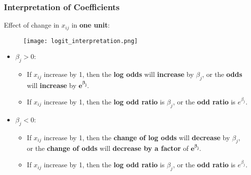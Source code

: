 \subsubsection{Interpretation of Coefficients}
Effect of change in $x_{ij}$ in \textbf{one unit}:
\begin{figure}[H]
	\centering
	\texttt{[image: logit\_interpretation.png]}
\end{figure}
\begin{itemize}
	\item $\beta_j >0$: 
	\begin{itemize}
		\item If $x_{ij}$ increase by 1, then the \textbf{log odds} will \textbf{increase} by $\beta_j$, or the \textbf{odds} will \textbf{increase} by $\mathbf{e^{\beta_j}}$.
		\item If $x_{ij}$ increase by 1, then the \textbf{log odd ratio} is $\beta_j$, or the \textbf{odd ratio} is $e^{\beta_j}$.
	\end{itemize}
	\item $\beta_j < 0$:
	 \begin{itemize}
	 	\item If $x_{ij}$ increase by 1, then the \textbf{change of log odds} will \textbf{decrease} by $\beta_j$, or the \textbf{change of odds} will \textbf{decrease by a factor} of $\mathbf{e^{\beta_j}}$.
	 	\item If $x_{ij}$ increase by 1, then the \textbf{log odd ratio} is $\beta_j$, or the \textbf{odd ratio} is $e^{\beta_j}$.
	 \end{itemize}
\end{itemize}




